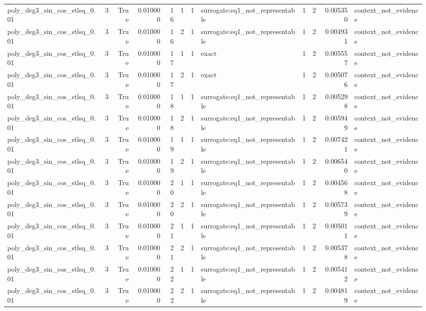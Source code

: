 \begin{tabular}{lrrrrrrlrrrl}
poly\_deg3\_sin\_cos\_stlsq\_0.01 & 3 & True & 0.010000 & 16 & 1 & 1 & surrogate:eq1\_not\_representable & 1 & 2 & 0.005350 & context\_not\_evidence \\
poly\_deg3\_sin\_cos\_stlsq\_0.01 & 3 & True & 0.010000 & 16 & 2 & 1 & surrogate:eq1\_not\_representable & 1 & 2 & 0.004931 & context\_not\_evidence \\
poly\_deg3\_sin\_cos\_stlsq\_0.01 & 3 & True & 0.010000 & 17 & 1 & 1 & exact & 1 & 2 & 0.005557 & context\_not\_evidence \\
poly\_deg3\_sin\_cos\_stlsq\_0.01 & 3 & True & 0.010000 & 17 & 2 & 1 & exact & 1 & 2 & 0.005076 & context\_not\_evidence \\
poly\_deg3\_sin\_cos\_stlsq\_0.01 & 3 & True & 0.010000 & 18 & 1 & 1 & surrogate:eq1\_not\_representable & 1 & 2 & 0.005298 & context\_not\_evidence \\
poly\_deg3\_sin\_cos\_stlsq\_0.01 & 3 & True & 0.010000 & 18 & 2 & 1 & surrogate:eq1\_not\_representable & 1 & 2 & 0.005949 & context\_not\_evidence \\
poly\_deg3\_sin\_cos\_stlsq\_0.01 & 3 & True & 0.010000 & 19 & 1 & 1 & surrogate:eq1\_not\_representable & 1 & 2 & 0.007421 & context\_not\_evidence \\
poly\_deg3\_sin\_cos\_stlsq\_0.01 & 3 & True & 0.010000 & 19 & 2 & 1 & surrogate:eq1\_not\_representable & 1 & 2 & 0.006540 & context\_not\_evidence \\
poly\_deg3\_sin\_cos\_stlsq\_0.01 & 3 & True & 0.010000 & 20 & 1 & 1 & surrogate:eq1\_not\_representable & 1 & 2 & 0.004568 & context\_not\_evidence \\
poly\_deg3\_sin\_cos\_stlsq\_0.01 & 3 & True & 0.010000 & 20 & 2 & 1 & surrogate:eq1\_not\_representable & 1 & 2 & 0.005739 & context\_not\_evidence \\
poly\_deg3\_sin\_cos\_stlsq\_0.01 & 3 & True & 0.010000 & 21 & 1 & 1 & surrogate:eq1\_not\_representable & 1 & 2 & 0.005011 & context\_not\_evidence \\
poly\_deg3\_sin\_cos\_stlsq\_0.01 & 3 & True & 0.010000 & 21 & 2 & 1 & surrogate:eq1\_not\_representable & 1 & 2 & 0.005378 & context\_not\_evidence \\
poly\_deg3\_sin\_cos\_stlsq\_0.01 & 3 & True & 0.010000 & 22 & 1 & 1 & surrogate:eq1\_not\_representable & 1 & 2 & 0.005412 & context\_not\_evidence \\
poly\_deg3\_sin\_cos\_stlsq\_0.01 & 3 & True & 0.010000 & 22 & 2 & 1 & surrogate:eq1\_not\_representable & 1 & 2 & 0.004819 & context\_not\_evidence \\

\end{tabular}
